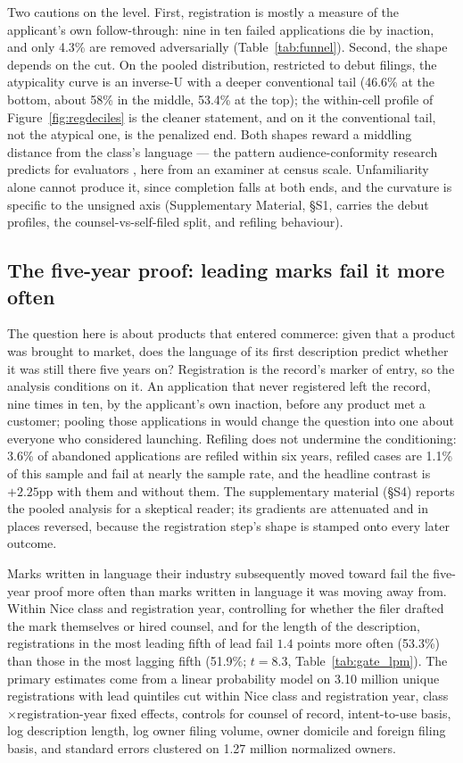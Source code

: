Two cautions on the level. First, registration is mostly a measure of
the applicant's own follow-through: nine in ten failed applications die
by inaction, and only 4.3\% are removed adversarially
(Table~\ref{tab:funnel}). Second, the shape depends on the cut. On the
pooled distribution, restricted to debut filings, the atypicality curve
is an inverse-U with a deeper conventional tail (46.6\% at the bottom,
about 58\% in the middle, 53.4\% at the top); the within-cell profile of
Figure~\ref{fig:regdeciles} is the cleaner statement, and on it the
conventional tail, not the atypical one, is the penalized end. Both
shapes reward a middling distance from the class's language --- the
pattern audience-conformity research predicts for evaluators
\citep{Zuckerman1999, Hsu2006, Zhao2017}, here from an examiner at
census scale. Unfamiliarity alone cannot produce it, since completion
falls at both ends, and the curvature is specific to the unsigned axis
(Supplementary Material, \S S1, carries the debut profiles, the
counsel-vs-self-filed split, and refiling behaviour).

\subsection{The five-year proof: leading marks fail it more
often}\label{sec:gate}\label{sec:val_gate}

The question here is about products that entered commerce: given that a
product was brought to market, does the language of its first
description predict whether it was still there five years on?
Registration is the record's marker of entry, so the analysis conditions
on it. An application that never registered left the record, nine times
in ten, by the applicant's own inaction, before any product met a
customer; pooling those applications in would change the question into
one about everyone who considered launching. Refiling does not
undermine the conditioning: 3.6\% of abandoned applications are refiled
within six years, refiled cases are 1.1\% of this sample and fail at
nearly the sample rate, and the headline contrast is $+2.25$pp with
them and without them. The supplementary material (\S S4) reports the
pooled analysis for a skeptical reader; its gradients are attenuated and in
places reversed, because the registration step's shape is stamped onto
every later outcome.

Marks written in language their industry subsequently moved toward fail
the five-year proof more often than marks written in language it was
moving away from. Within Nice class and registration year, controlling
for whether the filer drafted the mark themselves or hired counsel, and
for the length of the description, registrations in the most leading
fifth of lead fail $1.4$ points more often (53.3\%) than those in the
most lagging fifth (51.9\%; $t = 8.3$, Table~\ref{tab:gate_lpm}). The
primary estimates come from a linear probability model on 3.10 million
unique registrations with lead quintiles cut within Nice class and
registration year, class$\times$registration-year fixed effects,
controls for counsel of record, intent-to-use basis, log description
length, log owner filing volume, owner domicile and foreign filing
basis, and standard errors clustered on 1.27 million normalized owners.

